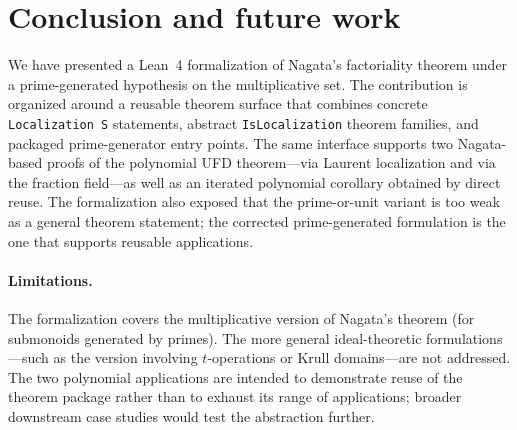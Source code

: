 \documentclass[11pt]{article}
\theoremstyle{plain}
\theoremstyle{definition}
\theoremstyle{remark}
\newcommand{\li}[1]{\texorpdfstring{\texttt{#1}}{#1}}
\begin{document}
\section{Conclusion and future work}\label{sec:conclusion}

We have presented a Lean~4 formalization of Nagata's factoriality theorem under
a prime-generated hypothesis on the multiplicative set.  The contribution is
organized around a reusable theorem surface that combines concrete
\li{Localization\,S} statements, abstract \li{IsLocalization} theorem families,
and packaged prime-generator entry points.  The same interface supports two
Nagata-based proofs of the polynomial UFD theorem---via Laurent localization and
via the fraction field---as well as an iterated polynomial corollary obtained
by direct reuse.  The formalization also exposed that the prime-or-unit variant
is too weak as a general theorem statement; the corrected prime-generated
formulation is the one that supports reusable applications.

\paragraph{Limitations.}
The formalization covers the multiplicative version of Nagata's theorem (for
submonoids generated by primes).  The more general ideal-theoretic
formulations---such as the version involving $t$-operations or Krull
domains---are not addressed.  The two polynomial applications are intended to
demonstrate reuse of the theorem package rather than to exhaust its range of
applications; broader downstream case studies would test the abstraction
further.
\end{document}
